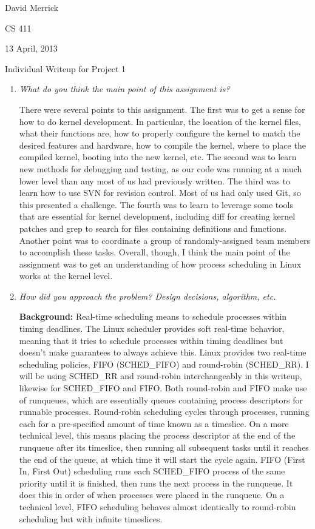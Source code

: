 \documentclass[letterpaper,10pt,titlepage]{article}
\newcommand{\ignore}[2]{\hspace{0in}#2} %
\newcommand{\tab}{\hspace*{2em}} %
\def\name{David Merrick}
\begin{document}
\name

CS 411

13 April, 2013

\begin{center}
{\LARGE Individual Writeup for Project 1}
\end{center}

\begin{enumerate} 
\item \emph{What do you think the main point of this assignment is?}

\tab There were several points to this assignment. The first was to get a sense for how to do kernel development. In particular, the location of the kernel files, what their functions are, how to properly configure the kernel to match the desired features and hardware, how to compile the kernel, where to place the compiled kernel, booting into the new kernel, etc. The second was to learn new methods for debugging and testing, as our code was running at a much lower level than any most of us had previously written. The third was to learn how to use SVN for revision control. Most of us had only used Git, so this presented a challenge. The fourth was to learn to leverage some tools that are essential for kernel development, including diff for creating kernel patches and grep to search for files containing definitions and functions. Another point was to coordinate a group of randomly-assigned team members to accomplish these tasks. Overall, though, I think the main point of the assignment was to get an understanding of how process scheduling in Linux works at the kernel level.

\item \emph{How did you approach the problem? Design decisions, algorithm, etc.}

\tab \textbf{Background:} Real-time scheduling means to schedule processes within timing deadlines. The Linux scheduler provides soft real-time behavior, meaning that it tries to schedule processes within timing deadlines but doesn't make guarantees to always achieve this. Linux provides two real-time scheduling policies, FIFO (SCHED\_FIFO) and round-robin (SCHED\_RR)\ignore{[Source: Linux Kernel Development, pg. 64]}. I will be using SCHED\_RR and round-robin interchangeably in this writeup, likewise for SCHED\_FIFO and FIFO. Both round-robin and FIFO make use of runqueues, which are essentially queues containing process descriptors for runnable processes. Round-robin scheduling cycles through processes, running each for a pre-specified amount of time known as a timeslice. On a more technical level, this means placing the process descriptor at the end of the runqueue after its timeslice, then running all subsequent tasks until it reaches the end of the queue, at which time it will start the cycle again. FIFO (First In, First Out) scheduling runs each SCHED\_FIFO process of the same priority until it is finished, then runs the next process in the runqueue. It does this in order of when processes were placed in the runqueue. On a technical level, FIFO scheduling behaves almost identically to round-robin scheduling but with infinite timeslices. \ignore{[Source: http://oreilly.com/catalog/linuxkernel/chapter/ch10.html]}


\end{enumerate}
\end{document}
